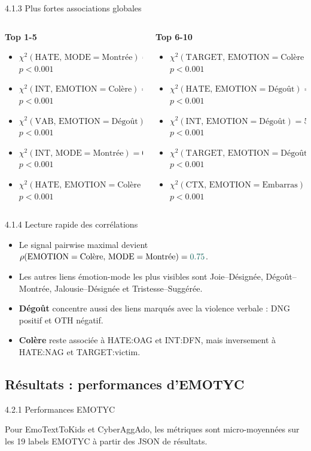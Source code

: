 \documentclass[aspectratio=169,10pt,xcolor=table]{beamer}
\newcommand{\pval}[1]{\ensuremath{#1}}
\newcommand{\pos}[1]{\textcolor{Positive}{#1}}
\newcommand{\chiitem}[5]{\item \(\chi^2(\mathrm{#1},\,\mathrm{#2}=\text{#3}) = #4\)\\[-0.15em]{\tiny \(p\pval{#5}\)}}
\begin{document}
\begin{frame}{4.1.3 Plus fortes associations globales}
\scriptsize
\begin{columns}[T,onlytextwidth]
\begin{column}{0.49\textwidth}
\textbf{Top 1-5}
\begin{itemize}
\setlength\itemsep{0.55em}
\chiitem{HATE}{MODE}{Montrée}{83.92}{<0.001}
\chiitem{INT}{EMOTION}{Colère}{72.93}{<0.001}
\chiitem{VAB}{EMOTION}{Dégoût}{71.21}{<0.001}
\chiitem{INT}{MODE}{Montrée}{68.60}{<0.001}
\chiitem{HATE}{EMOTION}{Colère}{55.13}{<0.001}
\end{itemize}
\end{column}
\begin{column}{0.49\textwidth}
\textbf{Top 6-10}
\begin{itemize}
\setlength\itemsep{0.55em}
\chiitem{TARGET}{EMOTION}{Colère}{52.89}{<0.001}
\chiitem{HATE}{EMOTION}{Dégoût}{51.78}{<0.001}
\chiitem{INT}{EMOTION}{Dégoût}{50.45}{<0.001}
\chiitem{TARGET}{EMOTION}{Dégoût}{36.91}{<0.001}
\chiitem{CTX}{EMOTION}{Embarras}{35.50}{<0.001}
\end{itemize}
\end{column}
\end{columns}
\end{frame}

\begin{frame}{4.1.4 Lecture rapide des corrélations}
\small
\begin{itemize}
  \item Le signal pairwise maximal devient \(\rho(\mathrm{EMOTION}=\text{Colère},\,\mathrm{MODE}=\text{Montrée})=\pos{0.75}\).
  \item Les autres liens émotion-mode les plus visibles sont Joie--Désignée, Dégoût--Montrée, Jalousie--Désignée et Tristesse--Suggérée.
  \item \textbf{Dégoût} concentre aussi des liens marqués avec la violence verbale : DNG positif et OTH négatif.
  \item \textbf{Colère} reste associée à HATE:OAG et INT:DFN, mais inversement à HATE:NAG et TARGET:victim.
\end{itemize}
\end{frame}


\subsection{Résultats : performances d'EMOTYC}

\begin{frame}{4.2.1 Performances EMOTYC}
\centering
\vspace{1.0em}
\small


\vspace{0.6em}
{\footnotesize\color{emotycMuted}Pour EmoTextToKids et CyberAggAdo, les métriques sont micro-moyennées sur les 19 labels EMOTYC à partir des JSON de résultats.}
\end{frame}
\end{document}
